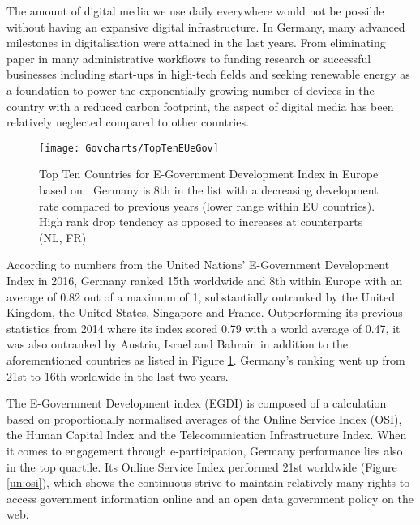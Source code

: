 The amount of digital media we use daily everywhere would not be possible without having an expansive digital infrastructure.
In Germany, many advanced milestones in digitalisation were attained in the last years. From eliminating paper in many administrative workflows 
to funding research or successful businesses including start-ups in high-tech fields %
and seeking renewable energy as a foundation %
to power the exponentially growing number of devices in the country with a reduced carbon footprint, the aspect of digital media has been relatively neglected compared to other countries. 


\begin{figure}[H]
	\caption[E-Government Development Index in Europe]{Top Ten Countries for E-Government Development Index in Europe based on \cite{un:egovReport}. Germany is 8th in the list with a decreasing development rate compared to previous years (lower range within EU countries). High rank drop tendency as opposed to increases at counterparts (NL, FR)} %
	\label{un:egci}
	\texttt{[image: Govcharts/TopTenEUeGov]} 
\end{figure}

According to numbers from the United Nations' E-Government Development Index in 2016, Germany ranked 15th worldwide and 8th within Europe with an average of 0.82 out of a maximum of 1, %
substantially outranked by the United Kingdom, the United States, Singapore and France. Outperforming its previous statistics from 2014 where its index scored  0.79 with a world average of 0.47, it was also outranked by Austria, Israel and Bahrain \cite{freiheit:digitalisierung} in addition to the aforementioned countries as listed in Figure \ref{un:egci}.  Germany's ranking went up from 21st to 16th worldwide in the last two years.



The E-Government Development index (EGDI) is composed of a calculation based on proportionally normalised averages of the Online Service Index (OSI), the Human Capital Index and the Telecomunication Infrastructure Index. 
When it comes to engagement through e-participation, Germany performance lies also in the top quartile. Its Online Service Index performed 21st worldwide (Figure \ref{un:osi}), which shows the continuous strive to maintain relatively many rights to access government information online and an open data government policy on the web.

